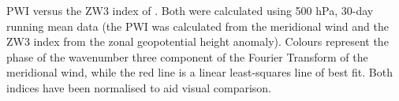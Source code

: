 \label{fig:metric_vs_zw3}
PWI versus the ZW3 index of \citet{Raphael2004}. Both were calculated using 500 hPa, 30-day running mean data (the PWI was calculated from the meridional wind and the ZW3 index from the zonal geopotential height anomaly). Colours represent the phase of the wavenumber three component of the Fourier Transform of the meridional wind, while the red line is a linear least-squares line of best fit. Both indices have been normalised to aid visual comparison.